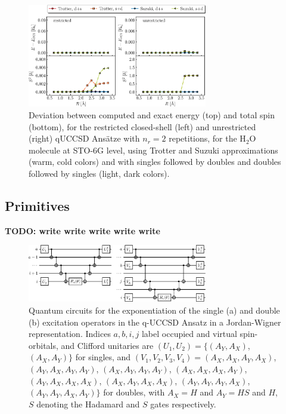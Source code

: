 \documentclass[aps,pra,onecolumn]{revtex4-2}
\newcommand{\todo}[1]{{\bf{{\color{red}TODO: #1}}}}
\begin{document}
\begin{figure}[t!]
\includegraphics[width=0.7\textwidth]{../figures/qUCCSD_flavors/quccsd_reps_2.eps}
\caption{Deviation between computed and exact energy (top) and total spin (bottom), for the restricted closed-shell (left) and unrestricted (right) qUCCSD Ans\"{a}tze with $n_r=2$ repetitions, for the H$_2$O molecule at STO-6G level, using Trotter and Suzuki approximations (warm, cold colors) and with singles followed by doubles and doubles followed by singles (light, dark colors).}
\label{figure:quccsd_reps_2}
\end{figure} 

\subsection{Primitives}

\todo{write write write write write}

\begin{figure}[t!]
\includegraphics[width=0.7\textwidth]{../figures/circuits/quccsd_primitives.eps}
\caption{
Quantum circuits for the exponentiation of the single (a) and double (b) excitation operators in the q-UCCSD Ansatz  in a Jordan-Wigner representation. 
Indices $a,b,i,j$ label occupied and virtual spin-orbitals, and Clifford unitaries are $(U_1,U_2)=\{(A_Y,A_X)$, $(A_X,A_Y)\}$ for singles,
and
$(V_1,V_2,V_3,V_4) = (A_X,A_X,A_Y,A_X)$, $(A_Y,A_X,A_Y,A_Y)$,
$(A_X,A_Y,A_Y,A_Y)$, $(A_X,A_X,A_X,A_Y)$, $(A_Y,A_X,A_X,A_X)$,
$(A_X,A_Y,A_X,A_X)$, $(A_Y,A_Y,A_Y,A_X)$, $(A_Y,A_Y,A_X,A_Y) \}$
for doubles, with
$A_X = H$ and $A_Y = HS$ and $H$, $S$ denoting the Hadamard and $S$ gates respectively.
}
\label{figure:quccsd_circuit}
\end{figure} 
\end{document}

